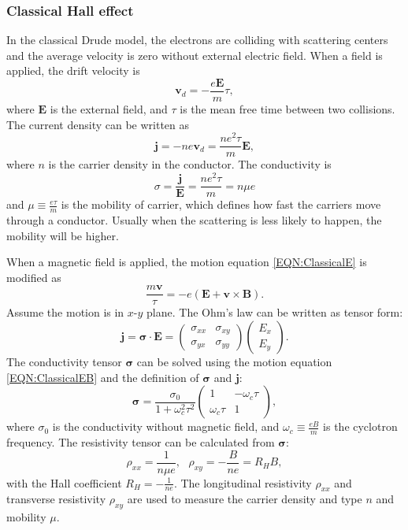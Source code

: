 \documentclass[pdflatex, sectionletters, 12pt, final, phd]{pittetd}    %
\begin{document}
\subsubsection{Classical Hall effect}

In the classical Drude model, the electrons are colliding with scattering centers and the average velocity is zero without external electric field. When a field is applied, the drift velocity is 
\begin{equation}
\mathbf{v}_d = -\frac{e\mathbf{E}}{m}\tau,
\label{EQN:ClassicalE}
\end{equation}
where $\mathbf{E}$ is the external field, and $\tau$ is the mean free time between two collisions. The current density can be written as 
$$\mathbf{j} = -ne\mathbf{v}_d = \frac{ne^2\tau}{m}\mathbf{E},$$
where $n$ is the carrier density in the conductor. The conductivity is 
\begin{equation}
\sigma = \frac{\mathbf{j}}{\mathbf{E}} = \frac{ne^2\tau}{m} = n\mu e
\label{EQN:Conductivity}
\end{equation}
and $\displaystyle \mu \equiv \frac{e\tau}{m}$ is the mobility of carrier, which defines how fast the carriers move through a conductor. Usually when the scattering is less likely to happen, the mobility will be higher.

When a magnetic field is applied, the motion equation \ref{EQN:ClassicalE} is modified as 
\begin{equation}
\frac{m\mathbf{v}}{\tau} = -e(\mathbf{E} + \mathbf{v} \times \mathbf{B}).
\label{EQN:ClassicalEB}
\end{equation}
Assume the motion is in $x$-$y$ plane. The Ohm's law can be written as tensor form:
$$
\mathbf{j} = 
\mathbf{\sigma} \cdot \mathbf{E} =
\begin{pmatrix}
\sigma_{xx} & \sigma_{xy} \\
\sigma_{yx} & \sigma_{yy}
\end{pmatrix}
\begin{pmatrix}
E_{x} \\
E_{y}
\end{pmatrix}.
$$
The conductivity tensor $\mathbf{\sigma}$ can be solved using the motion equation \ref{EQN:ClassicalEB} and the definition of $\mathbf{\sigma}$ and $\mathbf{j}$:
$$
\mathbf{\sigma} = \frac{\sigma_0}{1 + \omega_c^2\tau^2}
\begin{pmatrix}
1 & -\omega_c\tau \\
\omega_c\tau & 1
\end{pmatrix},
$$
where $\sigma_0$ is the conductivity without magnetic field, and $\displaystyle \omega_c \equiv \frac{eB}{m}$ is the cyclotron frequency. The resistivity tensor can be calculated from $\mathbf{\sigma}$:
\begin{equation}
\rho_{xx} = \frac{1}{n\mu e}, \ \ \ \rho_{xy} = -\frac{B}{n e} = R_H B,
\label{EQN:Hall}
\end{equation}
with the Hall coefficient $\displaystyle R_H = -\frac{1}{ne}.$
The longitudinal resistivity $\rho_{xx}$ and transverse resistivity $\rho_{xy}$ are used to measure the carrier density and type $n$ and mobility $\mu$.
\end{document}

